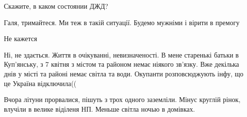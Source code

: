 \begin{itemize}
Скажите, в каком состоянии ДЖД?

Галя, тримайтеся. Ми теж в такій ситуації. Будемо мужніми і вірити в премогу

Не кажется


Ні, не здається. Життя в очікуванні, невизначеності. В мене старенькі батьки в
Куп'янську, з 7 квітня з містом та районом немає ніякого зв'язку. Вже декілька
днів у місті та районі немає світла та води. Окупанти розповсюджують інфу, що
це Україна відключила((


Вчора літуни прорвалися, пішуть з трох одного заземліли. Мінус круглій рінок,
влучіли в велике віділеня НП. Меньше світла ночью в домівках.

\end{itemize} %
